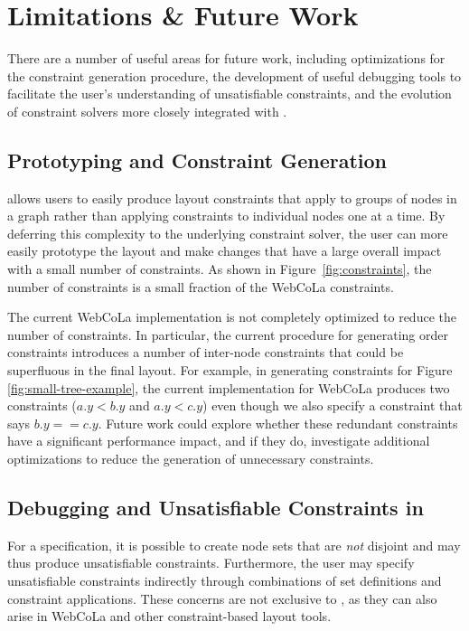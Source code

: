 \section{Limitations \& Future Work}
There are a number of useful areas for future work, including optimizations
for the constraint generation procedure, the development of useful debugging
tools to facilitate the user's understanding of unsatisfiable constraints,
and the evolution of constraint solvers more closely integrated with \projectname.


\subsection{Prototyping and Constraint Generation}
\projectname allows users to easily produce layout constraints that apply
to groups of nodes in a graph rather than applying constraints to individual
nodes one at a time. By deferring this complexity to the underlying constraint
solver, the user can more easily prototype the layout and make changes that
have a large overall impact with a small number of constraints.
As shown in Figure~\ref{fig:constraints},
the number of \projectname constraints is a small fraction of the WebCoLa constraints.

The current WebCoLa implementation is not completely optimized to reduce the
number of constraints. In particular, the current procedure for generating
order constraints introduces a number of inter-node constraints that could
be superfluous in the final layout. For example, in generating constraints
for Figure \ref{fig:small-tree-example}, the current \projectname implementation
for WebCoLa produces two constraints ($a.y < b.y$ and $a.y < c.y$) even though
we also specify a constraint that says $b.y == c.y$. Future work could explore
whether these redundant constraints have a significant performance impact,
and if they do, investigate additional optimizations to
reduce the generation of unnecessary constraints.

\subsection{Debugging and Unsatisfiable Constraints in \projectname}
For a \projectname specification, it is possible to create node sets that
are \emph{not} disjoint and may thus produce unsatisfiable constraints. Furthermore, 
the user may specify unsatisfiable constraints indirectly through
combinations of set definitions and constraint applications. These concerns
are not exclusive to \projectname, as they can also arise
in WebCoLa and other constraint-based layout tools.

